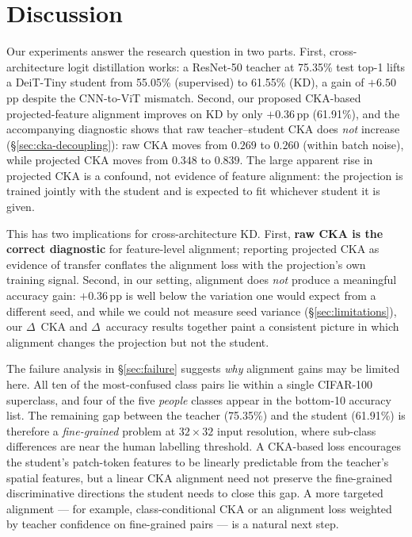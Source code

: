\documentclass[11pt, letterpaper]{article}
\begin{document}
\section{Discussion}

Our experiments answer the research question in two parts. First,
cross-architecture logit distillation works: a ResNet-50 teacher at 75.35\%
test top-1 lifts a DeiT-Tiny student from 55.05\% (supervised) to 61.55\%
(KD), a gain of $+6.50$\,pp despite the CNN-to-ViT mismatch. Second, our
proposed CKA-based projected-feature alignment improves on KD by only
$+0.36$\,pp (61.91\%), and the accompanying diagnostic shows that raw
teacher--student CKA does \emph{not} increase (\S\ref{sec:cka-decoupling}):
raw CKA moves from $0.269$ to $0.260$ (within batch noise), while projected
CKA moves from $0.348$ to $0.839$. The large apparent rise in projected CKA
is a confound, not evidence of feature alignment: the projection is trained
jointly with the student and is expected to fit whichever student it is
given.

This has two implications for cross-architecture KD. First, \textbf{raw CKA
is the correct diagnostic} for feature-level alignment; reporting projected
CKA as evidence of transfer conflates the alignment loss with the
projection's own training signal. Second, in our setting, alignment does
\emph{not} produce a meaningful accuracy gain: $+0.36$\,pp is well below the
variation one would expect from a different seed, and while we could not
measure seed variance (\S\ref{sec:limitations}), our $\Delta$~CKA and
$\Delta$~accuracy results together paint a consistent picture in which
alignment changes the projection but not the student.

The failure analysis in \S\ref{sec:failure} suggests \emph{why} alignment
gains may be limited here. All ten of the most-confused class pairs lie
within a single CIFAR-100 superclass, and four of the five \emph{people}
classes appear in the bottom-10 accuracy list. The remaining gap between
the teacher (75.35\%) and the student (61.91\%) is therefore a
\emph{fine-grained} problem at $32\times32$ input resolution, where sub-class
differences are near the human labelling threshold. A CKA-based loss
encourages the student's patch-token features to be linearly predictable
from the teacher's spatial features, but a linear CKA alignment need not
preserve the fine-grained discriminative directions the student needs to
close this gap. A more targeted alignment --- for example, class-conditional
CKA or an alignment loss weighted by teacher confidence on fine-grained
pairs --- is a natural next step.
\end{document}
